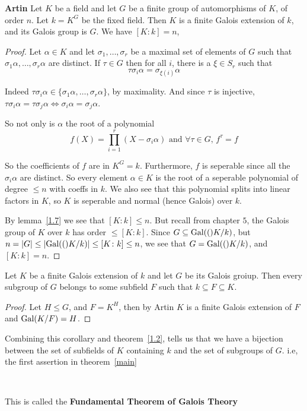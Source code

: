 \begin{theorem}\textbf{Artin}\label{1.8}
    Let $K$ be a field and let $G$ be a finite group of automorphisms of $K$, of order $n$. Let $k = K^G$ be the fixed field. Then $K$ is a finite Galois extension of $k$, and its Galois group is $G$. We have $[K\colon k] = n$,

    \begin{proof}
        Let $\alpha\in K$ and let $\sigma_1,\ldots,\sigma_r$ be a maximal set of elements of $G$ such that $\sigma_1\alpha,\ldots,\sigma_r\alpha$ are distinct. If $\tau\in G$ then for all $i$, there is a $\xi\in S_r$ such that\[\tau\sigma_i\alpha = \sigma_{\xi(i)}\alpha\]
    
        Indeed $\tau\sigma_i\alpha\in \{\sigma_1\alpha,\ldots,\sigma_r\alpha\}$, by maximality. And since $\tau$ is injective, $\tau\sigma_i\alpha = \tau\sigma_j\alpha\iff \sigma_i\alpha = \sigma_j\alpha$.
  
        So not only is $\alpha$ the root of a polynomial \[f(X) = \prod_{i=1}^r (X-\sigma_i\alpha) \text{ and }\forall \tau\in G \text{, }f^\tau = f \]

        So the coefficients of $f$ are in $K^G = k$. Furthermore, $f$ is seperable since all the $\sigma_i\alpha$ are distinct. So every element $\alpha\in K$ is the root of a seperable polynomial of degree $\leq n$ with coeffs in $k$. We also see that this polynomial splits into linear factors in $K$, so $K$ is seperable and normal (hence Galois) over $k$.

        By lemma~\ref{1.7} we see that $[K\colon k]\leq n$. But recall from chapter $5$, the Galois group of $K$ over $k$ has order $\leq [K\colon k]$. Since $G\subseteq \text{Gal}(()K/k)$, but $n = |G| \leq |\text{Gal}(()K/k)|\leq [K\colon k]\leq n$, we see that $G = \text{Gal}(()K/k)$, and $[K\colon k] = n$. 
    \end{proof}
 \end{theorem}
\begin{corollary}
    Let $K$ be a finite Galois extension of $k$ and let $G$ be its Galois groiup. Then every subgroup of $G$ belongs to some subfield $F$ such that $k\subseteq F\subseteq K$.
    \begin{proof}
        Let $H\leq G$, and $F=K^H$, then by Artin $K$ is a finite Galois extension of $F$ and $\text{Gal}(K/F) = H$.
    \end{proof}
\end{corollary}
\begin{bergman}
    Combining this corollary and theorem~\ref{1.2}, tells us that we have a bijection between the set of subfields of $K$ containing $k$ and the set of subgroups of $G$. i.e, the first assertion in theorem~\ref{main}
    
    \

    This is called the \textbf{Fundamental Theorem of Galois Theory}
\end{bergman}

